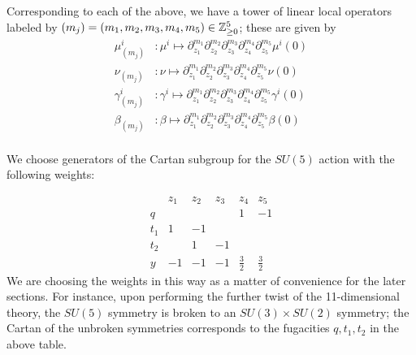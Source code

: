 Corresponding to each of the above, we have a tower of linear local operators labeled by $(m_j) = (m_1, m_2, m_3, m_4, m_5)\in \mathbb{Z}^5_{\geq 0}$; these are given by
\begin{align*}
 \mu^{i}_{(m_j)} &: \mu^{i}\mapsto \partial_{z_1}^{m_1}\partial_{z_2}^{m_2}\partial_{z_3}^{m_3}\partial_{z_4}^{m_4}\partial_{z_5}^{m_5}\mu^{i} (0) \\
\nu_{(m_j)} &: \nu\mapsto \partial_{z_1}^{m_1}\partial_{z_2}^{m_2}\partial_{z_3}^{m_3}\partial_{z_4}^{m_4}\partial_{z_5}^{m_5}\nu (0) \\
\gamma^{i}_{(m_j)} &: \gamma^{i}\mapsto \partial_{z_1}^{m_1}\partial_{z_2}^{m_2}\partial_{z_3}^{m_3}\partial_{z_4}^{m_4}\partial_{z_5}^{m_5}\gamma^{i} (0) \\
 \beta_{(m_j)} &: \beta\mapsto \partial_{z_1}^{m_1}\partial_{z_2}^{m_2}\partial_{z_3}^{m_3}\partial_{z_4}^{m_4}\partial_{z_5}^{m_5}\beta (0) \\
\end{align*}

We choose generators of the Cartan subgroup for the $SU(5)$ action with the following weights:

\[\begin{array}{|c|c|c|c|c|c|}
& z_1 & z_2 & z_3 & z_4 & z_5 \\
\hline
q & & & & 1 & -1 \\
t_1 & 1 & -1 & & & \\
t_2 & & 1 & -1 & & \\
y & -1 & -1 & -1 &\frac 3 2 & \frac 3 2
\end{array}\]
We are choosing the weights in this way as a matter of convenience for the later sections. 
For instance, upon performing the further twist of the 11-dimensional theory, the $SU(5)$ symmetry is broken to an $SU(3)\times SU(2)$ symmetry; the Cartan of the unbroken symmetries corresponds to the fugacities $q, t_1, t_2$ in the above table. 

